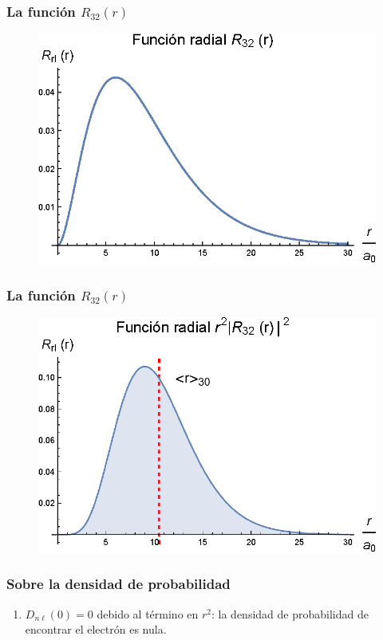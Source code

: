 \documentclass[12pt]{beamer}
\begin{document}
\begin{frame}
\frametitle{La función $R_{32} (r)$}
\begin{figure}
   \centering
   \includegraphics[scale=1]{Imagenes/Plot_Funcion_Radial_Hidrogeno_32_01.eps}
\end{figure}
\end{frame}
\begin{frame}
\frametitle{La función $R_{32} (r)$}
\begin{figure}
   \centering
   \includegraphics[scale=1]{Imagenes/Plot_Funcion_Radial_Hidrogeno_32_02.eps}
\end{figure}
\end{frame}
\begin{frame}
\frametitle{Sobre la densidad de probabilidad}
\begin{enumerate}[<+->]
\item $D_{n \ell} (0) = 0$ debido al término en $r^{2}$: \pause la densidad de probabilidad de encontrar el electrón es nula.
\seti
\end{enumerate}
\end{frame}
\end{document}

